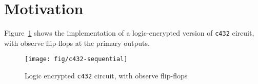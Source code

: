 \section{Motivation}

Figure~\ref{fig:c432-logic-encrypted-observe-flops} shows the implementation of a logic-encrypted version of \texttt{c432} circuit, with observe flip-flops at the primary outputs.  
\begin{figure}[!htbp]
	\centering
	\texttt{[image: fig/c432-sequential]}
	\caption{Logic encrypted \texttt{c432} circuit, with observe flip-flops}
	\label{fig:c432-logic-encrypted-observe-flops}
\end{figure}

